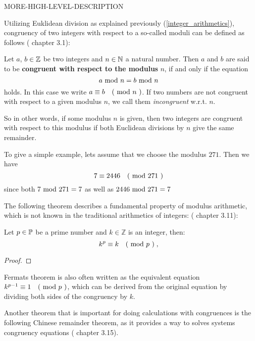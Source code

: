MORE-HIGH-LEVEL-DESCRIPTION

Utilizing Euklidean division as explained previously (\ref{integer_arithmetics}), congruency of two integers with respect to a so-called moduli can be defined as follows
(\cite{JB} chapter 3.1):
\begin{definition} [congruency] Let $ a $, $ b \in \mathbb{Z} $ be two integers and $ n \in \mathbb{N} $ a natural number.
Then $ a $ and $ b $ are said to be \textbf{congruent with respect to the modulus} $ n $, if and only if the equation
\begin{equation}
a \text{ mod } n = b \text{ mod } n
\end{equation}
holds. In this case we write
$ a \equiv b \quad \text{( mod } n \text{ )} $. If two numbers are not congruent with respect to a given modulus $n$, we call them \textit{incongruent} w.r.t. $n$.
\end{definition}
So in other words, if some modulus $n$ is given, then two integers are congruent with respect to this modulus if both Euclidean divisions by $n$ give the same remainder.   
\begin{example}To give a simple example, lets assume that we choose the modulus $271$. Then we have
$$ 7 \equiv 2446 \quad \text{( mod } 271 \text{ )} $$
since both $7 \text{ mod } 271 = 7$ as well as $2446 \text{ mod } 271=7$
\end{example}
The following theorem describes a fundamental property of modulus arithmetic, which is not known in the traditional arithmetics of integers: (\cite{JB} chapter 3.11):
\begin{theorem}  Let $ p \in \mathbb{P} $ be a prime number and $ k \in \mathbb{Z} $ is an integer, then:
\begin{equation}
k ^ p \equiv k \quad \text{( mod } p \text{ )} \;,
\end{equation}
\end{theorem}
\begin{proof} 
\end{proof}
\begin{remark}
Fermats theorem is also often written as the equivalent equation $k ^{p-1} \equiv 1 \quad \text{( mod } p \text{ )}$, which can be derived from the original equation by dividing both sides of the congruency by $k$. 
\end{remark}
Another theorem that is important for doing calculations with congruences is the following Chinese remainder theorem, as it provides a way to solves systems congruency equations (\cite{JB} chapter 3.15).

